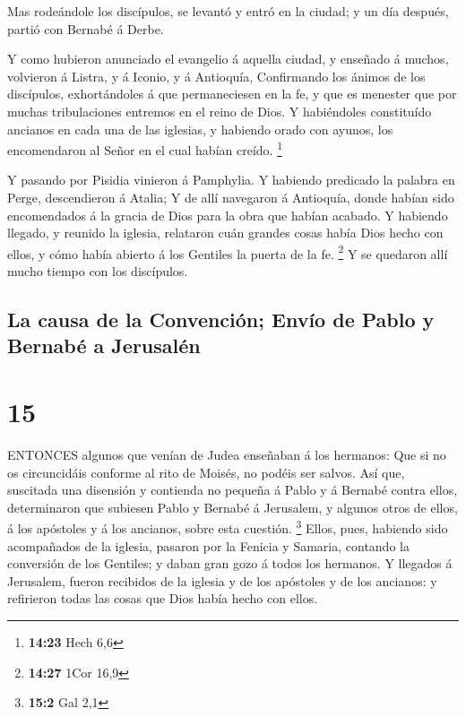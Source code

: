  Mas rodeándole los discípulos, se levantó y entró en la
ciudad; y un día después, partió con Bernabé á Derbe.

 Y como hubieron anunciado el evangelio á aquella ciudad, y
enseñado á muchos, volvieron á Listra, y á Iconio, y á Antioquía,
 Confirmando los ánimos de los discípulos, exhortándoles á
que permaneciesen en la fe, y que es menester que por muchas
tribulaciones entremos en el reino de Dios.  Y habiéndoles
constituído ancianos en cada una de las iglesias, y habiendo orado con
ayunos, los encomendaron al Señor en el cual habían creído. \footnote{\textbf{14:23}
  Hech 6,6}

 Y pasando por Pisidia vinieron á Pamphylia. 
Y habiendo predicado la palabra en Perge, descendieron á Atalia;
 Y de allí navegaron á Antioquía, donde habían sido
encomendados á la gracia de Dios para la obra que habían acabado.
 Y habiendo llegado, y reunido la iglesia, relataron cuán
grandes cosas había Dios hecho con ellos, y cómo había abierto á los
Gentiles la puerta de la fe. \footnote{\textbf{14:27} 1Cor 16,9}
 Y se quedaron allí mucho tiempo con los discípulos.

\hypertarget{la-causa-de-la-convenciuxf3n-envuxedo-de-pablo-y-bernabuxe9-a-jerusaluxe9n}{%
\subsection{La causa de la Convención; Envío de Pablo y Bernabé a
Jerusalén}\label{la-causa-de-la-convenciuxf3n-envuxedo-de-pablo-y-bernabuxe9-a-jerusaluxe9n}}

\hypertarget{section-14}{%
\section{15}\label{section-14}}

 ENTONCES algunos que venían de Judea enseñaban á los
hermanos: Que si no os circuncidáis conforme al rito de Moisés, no
podéis ser salvos.  Así que, suscitada una disensión y
contienda no pequeña á Pablo y á Bernabé contra ellos, determinaron que
subiesen Pablo y Bernabé á Jerusalem, y algunos otros de ellos, á los
apóstoles y á los ancianos, sobre esta cuestión. \footnote{\textbf{15:2}
  Gal 2,1}  Ellos, pues, habiendo sido acompañados de la
iglesia, pasaron por la Fenicia y Samaria, contando la conversión de los
Gentiles; y daban gran gozo á todos los hermanos.  Y
llegados á Jerusalem, fueron recibidos de la iglesia y de los apóstoles
y de los ancianos: y refirieron todas las cosas que Dios había hecho con
ellos.

